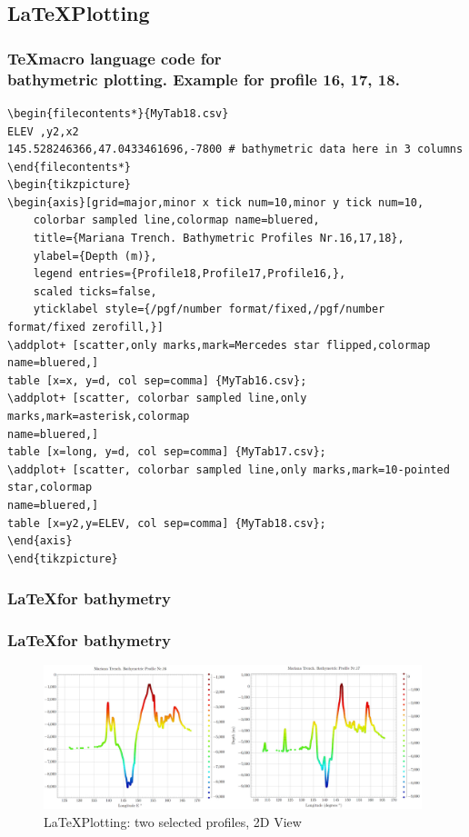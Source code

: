 \documentclass[pdflatex,compress,10pt,
	xcolor={dvipsnames,dvipsnames,svgnames,x11names,table},
	hyperref={colorlinks = true,breaklinks = true, urlcolor = NavyBlue, breaklinks = true}]{beamer}
\begin{document}
\subsection{\LaTeX \space Plotting}

\begin{frame}[fragile]\frametitle{\TeX \space macro language code for \\bathymetric plotting. Example for profile 16, 17, 18.}
\begin{Verbatim}[fontsize=\scriptsize]
\begin{filecontents*}{MyTab18.csv}
ELEV ,y2,x2
145.528246366,47.0433461696,-7800 # bathymetric data here in 3 columns 
\end{filecontents*}
\begin{tikzpicture}
\begin{axis}[grid=major,minor x tick num=10,minor y tick num=10,
	colorbar sampled line,colormap name=bluered,
	title={Mariana Trench. Bathymetric Profiles Nr.16,17,18},
	ylabel={Depth (m)},
	legend entries={Profile18,Profile17,Profile16,},
	scaled ticks=false,
	yticklabel style={/pgf/number format/fixed,/pgf/number format/fixed zerofill,}]
\addplot+ [scatter,only marks,mark=Mercedes star flipped,colormap name=bluered,]
table [x=x, y=d, col sep=comma] {MyTab16.csv};
\addplot+ [scatter, colorbar sampled line,only marks,mark=asterisk,colormap
name=bluered,] 
table [x=long, y=d, col sep=comma] {MyTab17.csv};
\addplot+ [scatter, colorbar sampled line,only marks,mark=10-pointed star,colormap
name=bluered,] 
table [x=y2,y=ELEV, col sep=comma] {MyTab18.csv}; 
\end{axis} 
\end{tikzpicture}
\end{Verbatim}
\end{frame}

\begin{frame}\frametitle{\LaTeX \space for bathymetry}
\frametitle{\LaTeX \space for bathymetry}

\begin{figure}[H]
	\centering
		\includegraphics[width=11cm]{Fig-2-3.jpg}
	\caption{\LaTeX \space Plotting: two selected profiles, 2D View}\label{fig:2-3}
\end{figure}		
\end{frame}
\end{document}
